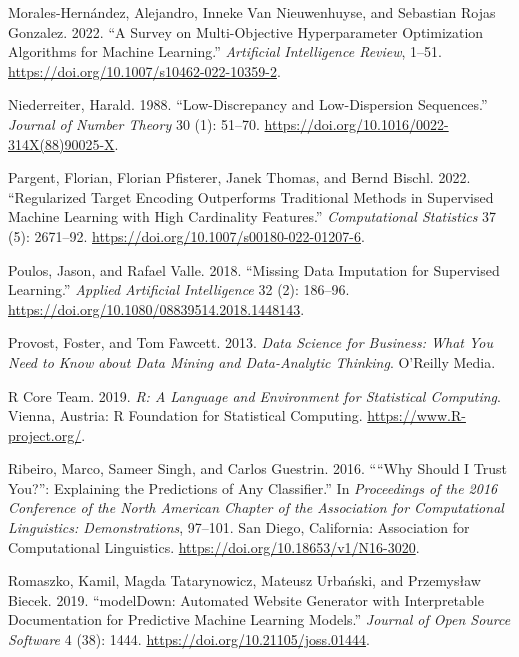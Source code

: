 \begin{CSLReferences}{1}{0}
\leavevmode{}%
Morales-Hernández, Alejandro, Inneke Van Nieuwenhuyse, and Sebastian
Rojas Gonzalez. 2022. {``A Survey on Multi-Objective Hyperparameter
Optimization Algorithms for Machine Learning.''} \emph{Artificial
Intelligence Review}, 1--51.
\url{https://doi.org/10.1007/s10462-022-10359-2}.

\leavevmode{}%
Niederreiter, Harald. 1988. {``Low-Discrepancy and Low-Dispersion
Sequences.''} \emph{Journal of Number Theory} 30 (1): 51--70.
\url{https://doi.org/10.1016/0022-314X(88)90025-X}.

\leavevmode{}%
Pargent, Florian, Florian Pfisterer, Janek Thomas, and Bernd Bischl.
2022. {``Regularized Target Encoding Outperforms Traditional Methods in
Supervised Machine Learning with High Cardinality Features.''}
\emph{Computational Statistics} 37 (5): 2671--92.
\url{https://doi.org/10.1007/s00180-022-01207-6}.

\leavevmode{}%
Poulos, Jason, and Rafael Valle. 2018. {``Missing Data Imputation for
Supervised Learning.''} \emph{Applied Artificial Intelligence} 32 (2):
186--96. \url{https://doi.org/10.1080/08839514.2018.1448143}.

\leavevmode{}%
Provost, Foster, and Tom Fawcett. 2013. \emph{Data Science for Business:
What You Need to Know about Data Mining and Data-Analytic Thinking}.
O'Reilly Media.

\leavevmode{}%
R Core Team. 2019. \emph{R: A Language and Environment for Statistical
Computing}. Vienna, Austria: {R} Foundation for Statistical Computing.
\url{https://www.R-project.org/}.

\leavevmode{}%
Ribeiro, Marco, Sameer Singh, and Carlos Guestrin. 2016. {``{``}Why
Should {I} Trust You?{''}: Explaining the Predictions of Any
Classifier.''} In \emph{Proceedings of the 2016 Conference of the North
{A}merican Chapter of the Association for Computational Linguistics:
Demonstrations}, 97--101. San Diego, California: Association for
Computational Linguistics. \url{https://doi.org/10.18653/v1/N16-3020}.

\leavevmode{}%
Romaszko, Kamil, Magda Tatarynowicz, Mateusz Urbański, and Przemysław
Biecek. 2019. {``modelDown: Automated Website Generator with
Interpretable Documentation for Predictive Machine Learning Models.''}
\emph{Journal of Open Source Software} 4 (38): 1444.
\url{https://doi.org/10.21105/joss.01444}.


\end{CSLReferences}
